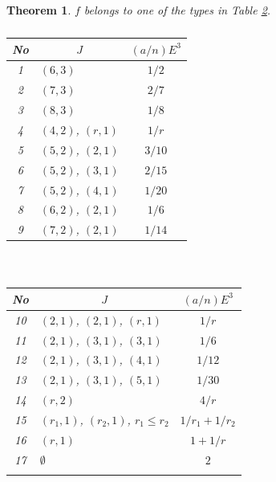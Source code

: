 \documentclass[a4paper,11pt]{amsart}
\newtheorem{theorem}{Theorem}[section]
\theoremstyle{definition}
\theoremstyle{remark}
\numberwithin{equation}{section}
\begin{document}
\begin{theorem}\label{thm:classification}
$f$ belongs to one of the types in Table \textup{\ref{tbl:classification}}.

\begin{table}[ht]
\caption{}\label{tbl:classification}
\begin{tabular}{c|l|c}
\hline
\textup{No} & \multicolumn{1}{c|}{$J$}                     & $(a/n)E^3$    \\
\hline
\textup{1}  & $(6,3)$                                      & $1/2$         \\
\textup{2}  & $(7,3)$                                      & $2/7$         \\
\textup{3}  & $(8,3)$                                      & $1/8$         \\
\textup{4}  & \textup{$(4,2)$, $(r,1)$}                    & $1/r$         \\
\textup{5}  & \textup{$(5,2)$, $(2,1)$}                    & $3/10$        \\
\textup{6}  & \textup{$(5,2)$, $(3,1)$}                    & $2/15$        \\
\textup{7}  & \textup{$(5,2)$, $(4,1)$}                    & $1/20$        \\
\textup{8}  & \textup{$(6,2)$, $(2,1)$}                    & $1/6$         \\
\textup{9}  & \textup{$(7,2)$, $(2,1)$}                    & $1/14$        \\
\hline
\end{tabular}
\
\begin{tabular}{c|l|c}
\hline
\textup{No} & \multicolumn{1}{c|}{$J$}                     & $(a/n)E^3$    \\
\hline
\textup{10} & \textup{$(2,1)$, $(2,1)$, $(r,1)$}           & $1/r$         \\
\textup{11} & \textup{$(2,1)$, $(3,1)$, $(3,1)$}           & $1/6$         \\
\textup{12} & \textup{$(2,1)$, $(3,1)$, $(4,1)$}           & $1/12$        \\
\textup{13} & \textup{$(2,1)$, $(3,1)$, $(5,1)$}           & $1/30$        \\
\textup{14} & $(r,2)$                                      & $4/r$         \\
\textup{15} & \textup{$(r_1,1)$, $(r_2,1)$, $r_1 \le r_2$} & $1/r_1+1/r_2$ \\
\textup{16} & $(r,1)$                                      & $1+1/r$       \\
\textup{17} & $\emptyset$                                  & $2$           \\
            &                                              &               \\
\hline
\end{tabular}
\end{table}
\end{theorem}
\end{document}
